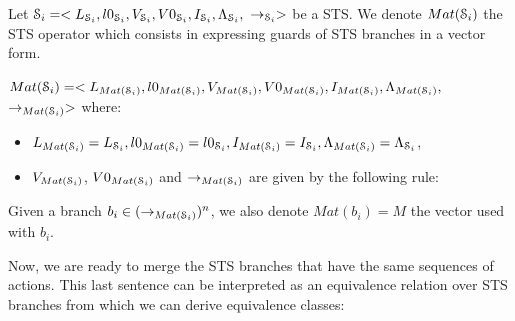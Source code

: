 \begin{definition}
	\label{rule:matrix}

  Let $\EuScript{S}_i=<L_{\EuScript{S}_i},l0_{\EuScript{S}_i},V_{\EuScript{S}_i},V0_{\EuScript{S}_i},I_{\EuScript{S}_i},\Lambda_{\EuScript{S}_i},$
  $\rightarrow_{\EuScript{S}_i}>$ be a STS. We denote
  $Mat(\EuScript{S}_i)$ the STS operator which consists in
  expressing guards of STS branches in a vector form.

  $Mat(\EuScript{S}_i)=<L_{Mat(\EuScript{S}_i)},l0_{Mat(\EuScript{S}_i)},V_{Mat(\EuScript{S}_i)},V0_{Mat(\EuScript{S}_i)},I_{Mat(\EuScript{S}_i)}\\,\Lambda_{Mat(\EuScript{S}_i)},$
  $\rightarrow_{Mat(\EuScript{S}_i)}>$ where:

	\begin{itemize}
		\item $L_{Mat(\EuScript{S}_i)}=L_{\EuScript{S}_i}, l0_{Mat(\EuScript{S}_i)}=l0_{\EuScript{S}_i}, I_{Mat(\EuScript{S}_i)}=I_{\EuScript{S}_i},\\\Lambda_{Mat(\EuScript{S}_i)} = \Lambda_{\EuScript{S}_i}$,

		\item $V_{Mat(\EuScript{S}_i)}$, $V0_{Mat(\EuScript{S}_i)}$ and $\rightarrow_{Mat(\EuScript{S}_i)}$ are given by the following rule:
	\end{itemize}


    Given a branch $b_i \in (\rightarrow_{Mat(\EuScript{S}_i)})^n$, we also denote
    $Mat(b_i)=M$ the vector used with $b_i$.
\end{definition}

Now, we are ready to merge the STS branches that have the same
sequences of actions. This last sentence can be interpreted as an
equivalence relation over STS branches from which we can derive
equivalence classes:

